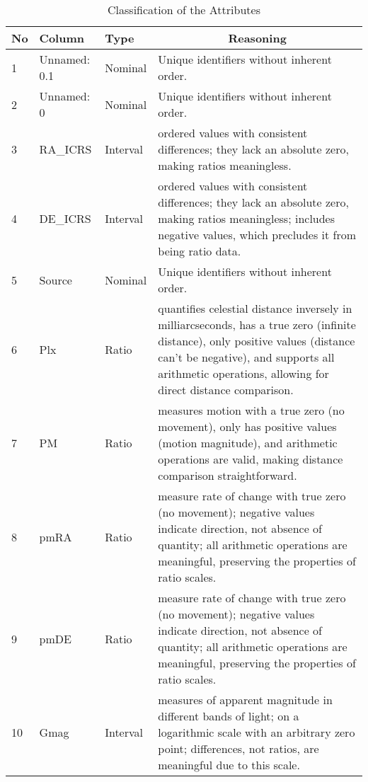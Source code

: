 \begin{table}[]
\centering
\caption{Classification of the Attributes}\label{table:column-types}
\tiny
\begin{tabular}{llll}
\hline
\textbf{No} & \textbf{Column} & \textbf{Type} & \multicolumn{1}{c}{\textbf{Reasoning}} \\
\hline
1           & Unnamed: 0.1         & Nominal                 & Unique identifiers without inherent order. \\
2           & Unnamed: 0           & Nominal                 & Unique identifiers without inherent order. \\
3           & RA\_ICRS             & Interval                & ordered values with consistent differences; they lack an absolute zero, making ratios meaningless. \\
4           & DE\_ICRS             & Interval                & ordered values with consistent differences; they lack an absolute zero, making ratios meaningless; includes negative values, which precludes it from being ratio data. \\
5           & Source               & Nominal                 & Unique identifiers without inherent order. \\
6           & Plx                  & Ratio                   & quantifies celestial distance inversely in milliarcseconds, has a true zero (infinite distance), only positive values (distance can't be negative), and supports all arithmetic operations, allowing for direct distance comparison. \\
7           & PM                   & Ratio                   & measures motion with a true zero (no movement), only has positive values (motion magnitude), and arithmetic operations are valid, making distance comparison straightforward. \\
8           & pmRA                 & Ratio                & measure rate of change with true zero (no movement); negative values indicate direction, not absence of quantity; all arithmetic operations are meaningful, preserving the properties of ratio scales. \\
9           & pmDE                 & Ratio                & measure rate of change with true zero (no movement); negative values indicate direction, not absence of quantity; all arithmetic operations are meaningful, preserving the properties of ratio scales. \\
10          & Gmag                 & Interval                   & measures of apparent magnitude in different bands of light; on a logarithmic scale with an arbitrary zero point; differences, not ratios, are meaningful due to this scale. \\

\end{tabular}
\end{table}
